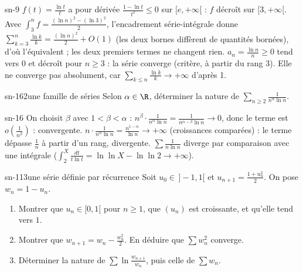 \begin{corrige}{sn-9}
 $f(t)=\frac{\ln t}t$ a pour dérivée $\frac{1-\ln t}{t^2}\leq0$ sur $[e,+\infty[$ : $f$ décroît sur $[3,+\infty[$. Avec $\int_3^nf=\frac{(\ln n)^2-(\ln3)^2}2$,
l'encadrement série-intégrale donne $\sum_{k=3}^n\frac{\ln k}k=\frac{(\ln n)^2}2+O(1)$ (les deux bornes diffèrent de quantités bornées), d'où
l'équivalent ; les deux premiers termes ne changent rien.
 $a_n=\frac{\ln n}n\geq0$ tend vers $0$ et décroît pour $n\geq3$ : la série converge (critère, à partir du rang 3). Elle ne converge pas
absolument, car $\sum_{k\leq n}\frac{\ln k}k\to+\infty$ d'après 1.
\end{corrige}

\begin{exo}{sn-16}{2}{une famille de séries}
Selon $\alpha\in\R$, déterminer la nature de $\sum_{n\geq2}\frac1{n^\alpha\ln n}$.
\end{exo}

\begin{corrige}{sn-16}
 On choisit $\beta$ avec $1<\beta<\alpha$ : $n^\beta\cdot\frac1{n^\alpha\ln n}=\frac1{n^{\alpha-\beta}\ln n}\to0$, donc le terme est
$o\left(\frac1{n^\beta}\right)$ : convergente.
 $n\cdot\frac1{n^\alpha\ln n}=\frac{n^{1-\alpha}}{\ln n}\to+\infty$ (croissances comparées) : le terme dépasse $\frac1n$ à partir d'un rang,
divergente.
 $\sum\frac1{n\ln n}$ diverge par comparaison avec une intégrale ($\int_2^X\frac{dt}{t\ln t}=\ln\ln X-\ln\ln2\to+\infty$).
\end{corrige}

\begin{exo}{sn-11}{3}{une série définie par récurrence}
Soit $u_0\in\,]-1,1[$ et $u_{n+1}=\frac{1+u_n^2}2$. On pose $w_n=1-u_n$.
\begin{enumerate}
\item Montrer que $u_n\in[0,1[$ pour $n\geq1$, que $(u_n)$ est croissante, et qu'elle tend vers $1$.
\item Montrer que $w_{n+1}=w_n-\frac{w_n^2}2$. En déduire que $\sum w_n^2$ converge.
\item Déterminer la nature de $\sum\ln\frac{w_{n+1}}{w_n}$, puis celle de $\sum w_n$.
\end{enumerate}
\end{exo}

